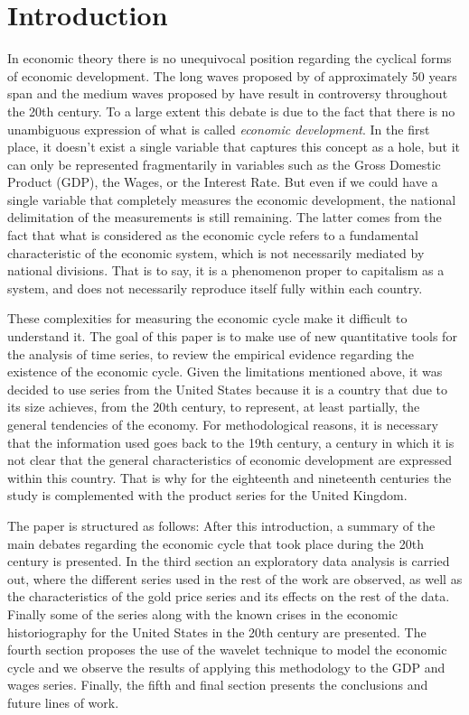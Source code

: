 \documentclass[a4paper]{article}
\begin{document}

\section{Introduction}
 
In economic theory there is no unequivocal position regarding the cyclical forms of economic development. The long waves proposed by \cite{kondratieff1979long} of approximately 50 years span and the medium waves proposed by \cite{kuznets1930secular} have result in controversy throughout the 20th century. To a large extent this debate is due to the fact that there is no unambiguous expression of what is called \textit{economic development}. In the first place, it doesn't exist a single variable that captures this concept as a hole, but it can only be represented fragmentarily in variables such as the Gross Domestic Product (GDP), the Wages, or the Interest Rate. But even if we could have a single variable that completely measures the economic development, the national delimitation of the measurements is still remaining. The latter comes from the fact that what is considered as the economic cycle refers to a fundamental characteristic of the economic system, which is not necessarily mediated by national divisions. That is to say, it is a phenomenon proper to capitalism as a system, and does not necessarily reproduce itself fully within each country.


These complexities for measuring the economic cycle make it difficult to understand it. The goal of this paper is to make use of new quantitative tools for the analysis of time series, to review the empirical evidence regarding the existence of the economic cycle. Given the limitations mentioned above, it was decided to use series from the United States because it is a country that due to its size achieves, from the 20th century, to represent, at least partially, the general tendencies of the economy. For methodological reasons, it is necessary that the information used goes back to the 19th century, a century in which it is not clear that the general characteristics of economic development are expressed within this country. That is why for the eighteenth and nineteenth centuries the study is complemented with the product series for the United Kingdom.

The paper is structured as follows: After this introduction, a summary of the main debates regarding the economic cycle that took place during the 20th century is presented. In the third section an exploratory data analysis is carried out, where the different series used in the rest of the work are observed, as well as the characteristics of the gold price series and its effects on the rest of the data. Finally some of the series along with the known crises in the economic historiography for the United States in the 20th century are presented. The fourth section proposes the use of the wavelet technique to model the economic cycle and we observe the results of applying this methodology to the GDP and wages series. Finally, the fifth and final section presents the conclusions and future lines of work.
\end{document}
